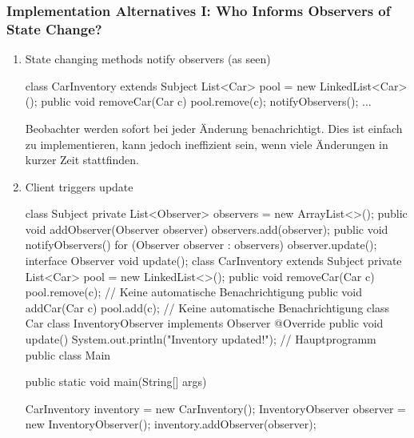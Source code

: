 \subsubsection{Implementation Alternatives I: Who Informs Observers of State Change?}
\begin{enumerate}
    \item State changing methods notify observers (as seen)
    \begin{codeBlock}{}
        class CarInventory extends Subject{
            List<Car> pool = new LinkedList<Car>();
            public void removeCar(Car c){
                pool.remove(c);
                notifyObservers();
            }
            ...
        }
    \end{codeBlock}
    \begin{infoBox}
        Beobachter werden sofort bei jeder Änderung benachrichtigt. Dies ist einfach zu implementieren, kann jedoch ineffizient sein, wenn viele Änderungen in kurzer Zeit stattfinden.
    \end{infoBox}
    \item Client triggers update
        \begin{codeBlock}{}
            class Subject {
                private List<Observer> observers = new ArrayList<>();
                public void addObserver(Observer observer) {
                    observers.add(observer);
                }
                public void notifyObservers() {
                    for (Observer observer : observers) {
                        observer.update();
                    }
                }
            }
            interface Observer {
                void update();
            }
            class CarInventory extends Subject {
                private List<Car> pool = new LinkedList<>();
                public void removeCar(Car c) {
                    pool.remove(c); // Keine automatische Benachrichtigung
                }
                public void addCar(Car c) {
                    pool.add(c); // Keine automatische Benachrichtigung
                }
            }
            class Car {}
            class InventoryObserver implements Observer {
                @Override
                public void update() {
                    System.out.println("Inventory updated!");
                }
            }
            // Hauptprogramm
            public class Main {
                public static void main(String[] args) {
                    CarInventory inventory = new CarInventory();
                    InventoryObserver observer = new InventoryObserver();
                    inventory.addObserver(observer);
            
}}
\end{codeBlock}
\end{enumerate}
